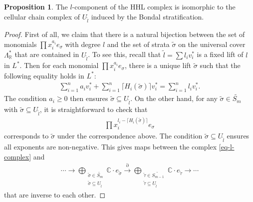 \documentclass[11pt,reqno]{amsart}
\def\C {{\mathbb C}}
\def\R {{\mathbb R}}
\theoremstyle{definition}
\newtheorem{proposition}[theorem]{Proposition}
\numberwithin{equation}{section}
\begin{document}
\begin{proposition}\label{prop-isomorphic-to-singular}
    The $l$-component of the HHL complex is isomorphic to the cellular chain complex of $U_{\widetilde{l}}$ induced by the Bondal stratification.
\end{proposition}
\begin{proof}
    First of all, we claim that there is a natural bijection between the set of monomials $\prod x_i^{a_i} e_{\sigma}$ with degree $l$ and the set of strata $\widetilde{\sigma}$ on the universal cover $\Lambda^*_{\R}$ that are contained in $U_{\widetilde{l}}$. To see this, recall that $\widetilde{l} = \sum l_i v_i^*$ is a fixed lift of $l$ in $L^*$. Then for each monomial $\prod x_i^{a_i} e_{\sigma}$, there is a unique lift $\widetilde{\sigma}$ such that the following equality holds in $L^*$:
    \begin{align}\label{eq1}
        \sum_{i=1}^n a_i v_i^* + \sum_{i=1}^n \lceil H_i(\widetilde{\sigma}) \rceil v_i^* = \sum_{i=1}^n l_i v_i^*.
    \end{align}
    The condition $a_i\geq 0$ then ensures $\widetilde{\sigma}\subseteq U_{\widetilde{l}}$. On the other hand, for any $\widetilde{\sigma}\in \widetilde{S_m}$ with $\widetilde{\sigma}\subseteq U_{\widetilde{l}}$, it is straightforward to check that
    \begin{align*}
        \prod x_i^{l_i - \lceil H_i(\widetilde{\sigma}) \rceil } e_{\sigma}
    \end{align*}
    corresponds to $\widetilde{\sigma}$ under the correspondence above. The condition $\widetilde{\sigma}\subseteq U_{\widetilde{l}}$ ensures all exponents are non-negative. This gives maps between the complex \eqref{eq-l-complex} and
    \begin{align*}
        \cdots\rightarrow  \bigoplus_{\substack{ \widetilde{\sigma}\in \widetilde{S_m} \\ \widetilde{\sigma}\subseteq U_{\widetilde{l}} }} \C \cdot e_{\widetilde{\sigma}}\xrightarrow{\partial}  \bigoplus_{\substack{ \widetilde{\tau}\in \widetilde{S_{m-1}} \\ \widetilde{\tau}\subseteq U_{\widetilde{l}} }} \C \cdot  e_{\widetilde{\tau}}\rightarrow \cdots
    \end{align*}
    that are inverse to each other. 

    \smallskip
    

\end{proof}
\end{document}

